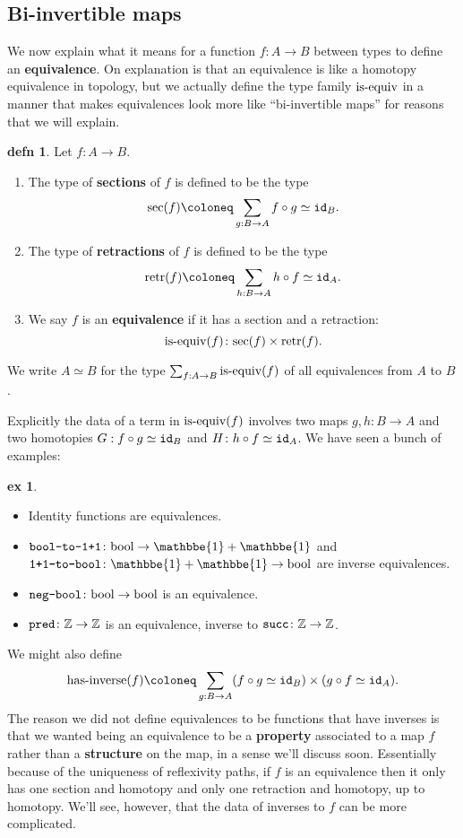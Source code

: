 \documentclass{amsart}
\theoremstyle{theorem}
\theoremstyle{definition}
\newtheorem*{defn}{defn}
\newtheorem*{ex}{ex}
\theoremstyle{remark}
\newcommand{\0}{\mathbbe{0}}
\newcommand{\1}{\mathbbe{1}}
\newcommand{\2}{\mathbbe{2}}
\newcommand{\3}{\mathbbe{3}}
\newcommand{\4}{\mathbbe{4}}
\newcommand{\term}[1]{{\textup{\texttt{#1}}}}
\newcommand{\type}[1]{{\textup{#1}}}
\newcommand{\id}{\term{id}}
\newcommand{\bZ}{{\mathbb{Z}}}
\newcommand{\bool}{\type{bool}}
\begin{document}
\subsection*{Bi-invertible maps}

We now explain what it means for a function $f \colon A \to B$ between types to define an \textbf{equivalence}. On explanation is that an equivalence is like a homotopy equivalence in topology, but we actually define the type family $\type{is-equiv}$ in a manner that makes equivalences look more like ``bi-invertible maps'' for reasons that we will explain.

\begin{defn} Let $f \colon A \to B$. 
\begin{enumerate}
\item The type of \textbf{sections} of $f$ is defined to be the type
\[ \type{sec}(f) \coloneq \sum_{g : B \to A} f\circ g \simeq \id_B.\]
\item The type of \textbf{retractions} of $f$ is defined to be the type
\[ \type{retr}(f) \coloneq \sum_{h : B \to A} h \circ f \simeq \id_A.\]
\item We say $f$ is an \textbf{equivalence} if it has a section and a retraction:
\[ \type{is-equiv}(f) \colon \type{sec}(f) \times \type{retr}(f).\]
\end{enumerate}
We write $A \simeq B$ for the type $\sum_{f : A \to B} \type{is-equiv}(f)$ of all equivalences from $A$ to $B$.
\end{defn}

Explicitly the data of a term in $\type{is-equiv}(f)$ involves two maps $g, h : B \to A$ and two homotopies $G : f \circ g \simeq \id_B$ and $H \colon h \circ f \simeq \id_A$. We have seen a bunch of examples:

\begin{ex} $\quad$
\begin{itemize}
\item Identity functions are equivalences.
\item $\term{bool-to-1+1} \colon \bool \to \1+\1$ and $\term{1+1-to-bool} \colon \1+\1 \to \bool$ are inverse equivalences.
\item $\term{neg-bool} \colon \bool \to \bool$ is an equivalence.
\item $\term{pred} \colon \bZ \to \bZ$ is an equivalence, inverse to $\term{succ} \colon \bZ \to \bZ$.
\end{itemize}
\end{ex}

We might also define
\[ \type{has-inverse}(f) \coloneq \sum_{g : B \to A} (f \circ g \simeq \id_B) \times (g \circ f \simeq \id_A).\]
The reason we did not define equivalences to be functions that have inverses is that we wanted being an equivalence to be a \textbf{property} associated to a map $f$ rather than a \textbf{structure} on the map, in a sense we'll discuss soon. Essentially because of the uniqueness of reflexivity paths, if $f$ is an equivalence then it only has one section and homotopy and only one retraction and homotopy, up to homotopy. We'll see, however, that the data of inverses to $f$ can be more complicated.
\end{document}

